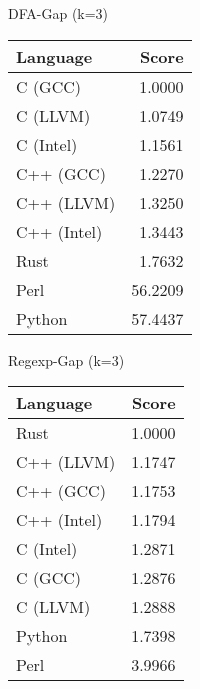 \begin{subtable}{0.33\textwidth}
    \centering
    \caption{DFA-Gap (k=3)}
    \label{table:runtime:dfa_gap(3)}
    \begin{tabular}{|l|r|}
        \hline
        Language & Score \\
        \hline
        C (GCC) & 1.0000 \\
        C (LLVM) & 1.0749 \\
        C (Intel) & 1.1561 \\
        C++ (GCC) & 1.2270 \\
        C++ (LLVM) & 1.3250 \\
        C++ (Intel) & 1.3443 \\
        Rust & 1.7632 \\
        Perl & 56.2209 \\
        Python & 57.4437 \\
        \hline
    \end{tabular}
\end{subtable}%
\begin{subtable}{0.33\textwidth}
    \centering
    \caption{Regexp-Gap (k=3)}
    \label{table:runtime:regexp(3)}
    \begin{tabular}{|l|r|}
        \hline
        Language & Score \\
        \hline
        Rust & 1.0000 \\
        C++ (LLVM) & 1.1747 \\
        C++ (GCC) & 1.1753 \\
        C++ (Intel) & 1.1794 \\
        C (Intel) & 1.2871 \\
        C (GCC) & 1.2876 \\
        C (LLVM) & 1.2888 \\
        Python & 1.7398 \\
        Perl & 3.9966 \\
        \hline
    \end{tabular}
\end{subtable}

